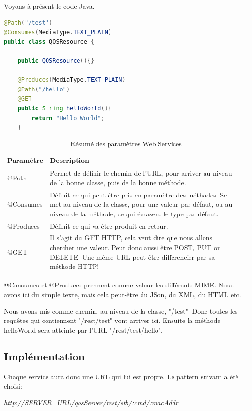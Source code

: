 \medskip

Voyons à présent le code Java.
\begin{lstlisting}[language=Java, caption={Implémentation Hello World Web Service}]
@Path("/test")
@Consumes(MediaType.TEXT_PLAIN)
public class QOSResource {
	
	public QOSResource(){}
	
	@Produces(MediaType.TEXT_PLAIN)
	@Path("/hello")
	@GET
	public String helloWorld(){
		return "Hello World";
	}
\end{lstlisting}
\begin{table}[H]
\begin{tabularx}{\textwidth}{|m{3cm}|X|l|}
  \hline
  \bf{Paramètre} & \bf{Description} \\
  \hline
  @Path & Permet de définir le chemin de l'URL, pour arriver au niveau de la bonne classe, puis de la bonne méthode.\\
  \hline  
  @Consumes & Définit ce qui peut être pris en paramètre des méthodes. Se met au niveau de la classe, pour une valeur par défaut, ou au niveau de la méthode, ce qui écrasera le type par défaut.\\
  \hline  
  @Produces & Définit ce qui va être produit en retour.\\
  \hline  
  @GET & Il s'agit du GET HTTP, cela veut dire que nous allons chercher une valeur. Peut donc aussi être POST, PUT ou DELETE. Une même URL peut être différencier par sa méthode HTTP!
\end{tabularx}
\caption{Résumé des paramètres Web Services}
\label{tab:classDiagram}
\end{table}

@Consumes et @Produces prennent comme valeur les différents MIME. Nous avons ici du simple texte, mais cela peut-être du JSon, du XML, du HTML etc.

\medskip

Nous avons mis comme chemin, au niveau de la classe, "/test". Donc toutes les requêtes qui contiennent "/rest/test" vont arriver ici. Ensuite la méthode helloWorld sera atteinte par l'URL "/rest/test/hello".

\subsection{Implémentation}
Chaque service aura donc une URL qui lui est propre. Le pattern suivant a été choisi:
\medskip

\textit{http://SERVER\_URL/qosServer/rest/stb/:cmd/:macAddr}

